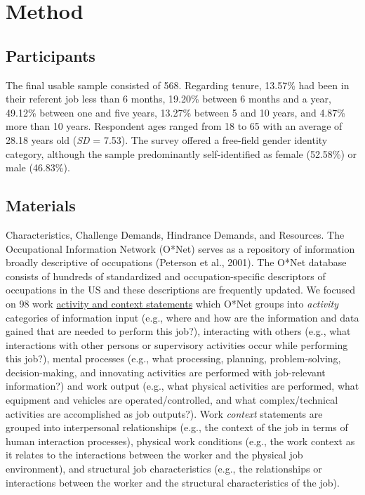 \documentclass[
  man]{apa7}
\begin{document}
\section{Method}\label{method}

\subsection{Participants}\label{participants}

The final usable sample consisted of 568. Regarding tenure, 13.57\% had been in their referent job less than 6 months, 19.20\% between 6 months and a year, 49.12\% between one and five years, 13.27\% between 5 and 10 years, and 4.87\% more than 10 years. Respondent ages ranged from 18 to 65 with an average of 28.18 years old (\emph{SD} = 7.53). The survey offered a free-field gender identity category, although the sample predominantly self-identified as female (52.58\%) or male (46.83\%).

\subsection{Materials}\label{materials}

Characteristics, Challenge Demands, Hindrance Demands, and Resources. The Occupational Information Network (O*Net) serves as a repository of information broadly descriptive of occupations (Peterson et al., 2001). The O*Net database consists of hundreds of standardized and occupation-specific descriptors of occupations in the US and these descriptions are frequently updated. We focused on 98 work \href{https://www.ONETonline.org/find/descriptor/result/4.A.1.b.3}{activity and context statements} which O*Net groups into \emph{activity} categories of information input (e.g., where and how are the information and data gained that are needed to perform this job?), interacting with others (e.g., what interactions with other persons or supervisory activities occur while performing this job?), mental processes (e.g., what processing, planning, problem-solving, decision-making, and innovating activities are performed with job-relevant information?) and work output (e.g., what physical activities are performed, what equipment and vehicles are operated/controlled, and what complex/technical activities are accomplished as job outputs?). Work \emph{context} statements are grouped into interpersonal relationships (e.g., the context of the job in terms of human interaction processes), physical work conditions (e.g., the work context as it relates to the interactions between the worker and the physical job environment), and structural job characteristics (e.g., the relationships or interactions between the worker and the structural characteristics of the job).
\end{document}
